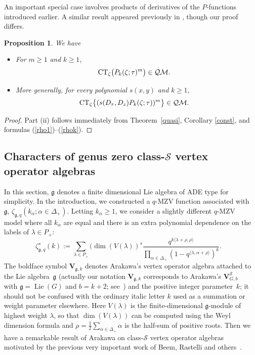 \documentclass[pdftex]{sigma}
\numberwithin{equation}{section}
\newtheorem{Proposition}[Theorem]{Proposition}
\theoremstyle{definition}
\begin{document}
An important special case involves products of derivatives of the $P$-functions introduced earlier.
A similar result appeared previously in \cite[Proposition~5.9]{GM}, though our proof differs.

\begin{Proposition} \label{P-power} We have
\begin{itemize}\itemsep=0pt
\item[$(i)$] For $m \geq 1$ and $k \geq 1$,
\[
{\rm CT}_{\zeta} \bigl(P_k(\zeta;\tau)^m \bigr) \in \mathcal{QM}.
\]
\item[$(ii)$] More generally, for every polynomial $s(x,y)$ and $k \geq 1$,
\[
{\rm CT}_{\zeta} \bigl\{ (s(D_\tau,D_{z}) P_k(\zeta;\tau))^{m} \bigr\} \in \mathcal{QM}.
\]
\end{itemize}
\end{Proposition}
\begin{proof} Part (ii) follows immediately from Theorem~\ref{quasi}, Corollary \ref{const}, and formulas (\ref{rho1})--(\ref{rhok}).
\end{proof}

\subsection[Characters of genus zero class-S vertex operator algebras]{Characters of genus zero class-$\boldsymbol{\mathcal{S}}$ vertex operator algebras}\label{section3.3}

In this section, $\mathfrak{g}$ denotes a finite dimensional Lie algebra of ADE type for simplicity. In the introduction, we
constructed a $q$-MZV function associated with $\mathfrak{g}$, $\zeta_{\mathfrak{g},q}(k_{\alpha}; \alpha \in \Delta_+)$. Letting $k_{\alpha} \geq 1$, we consider a slightly different $q$-MZV model where all $k_{\alpha}$ are equal and
there is an extra polynomial dependence on the labels of $\lambda \in P_+$:
\[
\zeta_{\mathfrak{g},q}^{s}(k):=\sum_{\lambda \in P_+} (\dim (V(\lambda))^{s} \frac{q^{k \langle\lambda+\rho,\rho\rangle}}{\prod_{\alpha \in \Delta_+} (1-q^{\langle \lambda, \alpha+\rho\rangle})^{k}}.
\]
The boldface symbol $\mathbf{V}_{\mathfrak g,k}$ denotes Arakawa's vertex operator algebra attached to the Lie algebra~$\mathfrak g$ (actually our notation $\mathbf V_{\mathfrak g,k}$ corresponds to Arakawa's $\mathbf V^{\mathcal S}_{G,b}$ with $\mathfrak g=
\operatorname{Lie}(G)$ and $b=k+2$; see~\cite{Arakawa})
and the positive integer parameter~$k$; it should not be confused with the ordinary italic letter $k$ used as a summation or weight parameter elsewhere.
Here $V(\lambda)$ is the finite-dimensional $\mathfrak{g}$-module of highest weight $\lambda$, so that $\dim (V(\lambda))$ can be computed using the Weyl dimension formula and $\rho=\frac12 \sum_{\alpha \in \Delta_+} \alpha$ is the half-sum of positive roots. Then we have a remarkable result of Arakawa on class-$\mathcal{S}$ vertex operator algebras motivated by the previous very important work of Beem, Rastelli and others~\cite{BR,Beem}.
\end{document}
